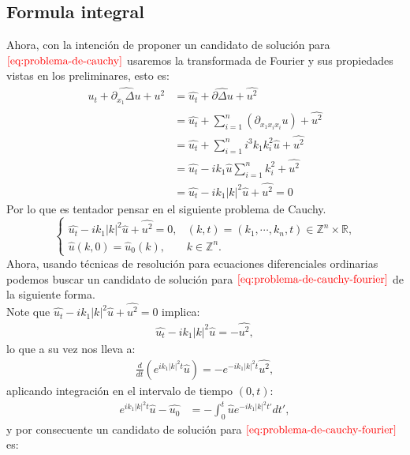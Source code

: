  \subsection{Formula integral}
    Ahora, con la intención de proponer un candidato de solución para $\textcolor{red}{\ref{eq:problema-de-cauchy}}$ usaremos la transformada de Fourier y sus propiedades vistas en los preliminares, esto es:
    \begin{align*}
      \hat{u_t+\partial_{x_1}\Delta u+u^2}&=\hat{u_t}+\hat{\partial \Delta u} + \hat{u^2}\\
      &=\hat{u_t}+\sum_{i=1}^{n}\hat{(\partial_{x_1x_ix_i}u)}+\hat{u^2}\\
      &=\hat{u_t}+\sum_{i=1}^{n}i^{3}k_1k_i^2\hat{u}+\hat{u^2}\\
      &=\hat{u_t}-ik_1\hat{u}\sum_{i=1}^{n}k_i^2+\hat{u^2}\\
      &=\hat{u_t}-ik_1|k|^2\hat{u}+\hat{u^2}=0
    \end{align*}
    Por lo que es tentador pensar en el siguiente problema de Cauchy.
    \begin{equation}
      \begin{cases}
        \hat{u_t}-ik_1|k|^2\hat{u}+\hat{u^2}=0, & (k,t)=(k_1,\cdots,k_n,t)\in \mathbb{Z}^{n}\times \mathbb{R} \text{,} \\
        \hat{u}(k,0)=\hat{u}_0(k), & k\in\mathbb{Z}^{n}.
      \end{cases}\label{eq:problema-de-cauchy-fourier} 
    \end{equation}
    Ahora, usando técnicas de resolución para ecuaciones diferenciales ordinarias podemos buscar un candidato de solución para $\textcolor{red}{\ref{eq:problema-de-cauchy-fourier}}$ de la siguiente forma.\\
    Note que $\hat{u_t}-ik_1|k|^2\hat{u}+\hat{u^2}=0$ implica: 
    \begin{align*}
      \hat{u_t}-ik_1|k|^2\hat{u}=-\hat{u^2},
    \end{align*}
    lo que a su vez nos lleva a:
    \begin{align*}
      \frac{d}{dt}\left( e^{ik_1|k|^2t}\hat{u} \right)=-e^{-ik_1|k|^2t}\hat{u^2},
    \end{align*}
    aplicando integración en el intervalo de tiempo $(0,t)$:
    \begin{align*}
      e^{ik_1|k|^2t}\hat{u}-\hat{u_0}&=-\int_{0}^{t}\hat{u}e^{-ik_1|k|^2t'}dt',
    \end{align*}
    y por consecuente un candidato de solución para $\textcolor{red}{\ref{eq:problema-de-cauchy-fourier}}$ es:
